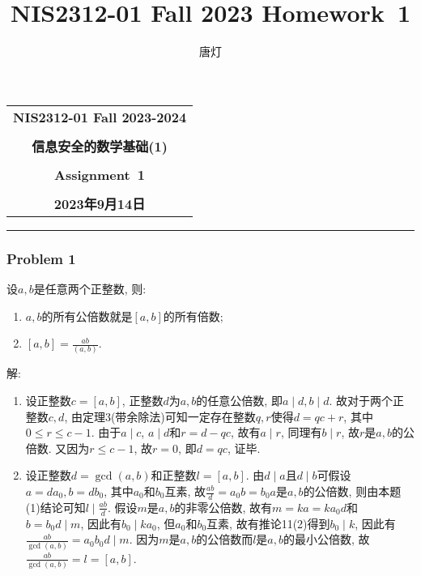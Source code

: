 \documentclass[a4paper,12pt]{ctexart}
\title{NIS2312-01 Fall 2023 Homework~1}
\author{唐灯}
\begin{document}
  \begin{center}

  \vspace{-0.3in}
  \begin{tabular}{c}
    \textbf{\Large NIS2312-01 Fall 2023-2024} \\
    \textbf{\Large  } \\
    \textbf{\Large  信息安全的数学基础(1)} \\
    \textbf{\Large  } \\
    \textbf{\Large  Assignment~1} \\
    \textbf{\Large  } \\
    \textbf{\Large 2023年9月14日} \\
  \end{tabular}
  \end{center}
  \noindent
  \rule{\linewidth}{0.4pt}
  
\subsubsection*{Problem 1}
    设$a,b$是任意两个正整数, 则: 
    \begin{enumerate}[label=(\arabic{*})]
        \item $a,b$的所有公倍数就是$\left[ a,b \right]$的所有倍数; 
        \item $\left[ a,b \right]=\frac{ab}{(a,b)}$.
    \end{enumerate}
    解: 
    \begin{enumerate}[label=(\arabic{*})]
        \item 设正整数$c=\left[ a,b\right]$, 正整数$d$为$a,b$的任意公倍数, 即$a\mid d,b\mid d$. 故对于两个正整数$c,d$, 由定理3(带余除法)可知一定存在整数$q,r$使得$d=qc+r$, 其中$0\le r\le c-1$. 由于$a\mid c$, $a\mid d$和$r=d-qc$, 故有$a\mid r$, 同理有$b\mid r$, 故$r$是$a,b$的公倍数. 又因为$r\le c-1$, 故$r=0$, 即$d=qc$, 证毕.
        \item  设正整数$d=\gcd(a,b)$和正整数$l=\left[ a,b \right]$. 由$d\mid a$且$d\mid b$可假设 $a=da_0,b=db_0$, 其中$a_0$和$b_0$互素, 故$\frac{ab}{d}=a_0b=b_0a$是$a,b$的公倍数, 则由本题(1)结论可知$l\mid \frac{ab}{d}$. 假设$m$是$a,b$的非零公倍数, 故有$m=ka=ka_0d$和 $b=b_0d\mid m$, 因此有$b_0\mid ka_0$, 但$a_0$和$b_0$互素, 故有推论11(2)得到$b_0\mid k$, 因此有$\frac{ab}{\gcd(a,b)}=a_0b_0d\mid m$. 因为$m$是$a,b$的公倍数而$l$是$a,b$的最小公倍数, 故$\frac{ab}{\gcd(a,b)}=l=\left[ a,b \right]$.
    \end{enumerate}
\end{document}
